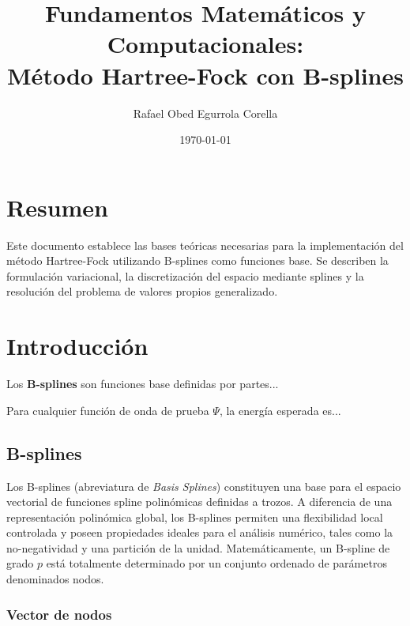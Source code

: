 \documentclass[12pt, a4paper, oneside, spanish]{book}
\title{\textbf{Fundamentos Matemáticos y Computacionales: \\ Método Hartree-Fock con B-splines}}
\author{Rafael Obed Egurrola Corella}
\date{\today}
\begin{document}
\frontmatter

\maketitle

\chapter*{Resumen}

Este documento establece las bases teóricas necesarias para la implementación del método Hartree-Fock utilizando B-splines como funciones base. Se describen la formulación variacional, la discretización del espacio mediante splines y la resolución del problema de valores propios generalizado.


\tableofcontents
\listoffigures

\mainmatter

\chapter{Introducción}

\begin{definition}
    Los \textbf{B-splines} son funciones base definidas por partes...
\end{definition}

\begin{theorem}
    Para cualquier función de onda de prueba $\Psi$, la energía esperada es...
\end{theorem}


\section{B-splines}

Los B-splines (abreviatura de \textit{Basis Splines}) constituyen una base para el espacio vectorial de funciones spline polinómicas definidas a trozos. A diferencia de una representación polinómica global, los B-splines permiten una flexibilidad local controlada y poseen propiedades ideales para el análisis numérico, tales como la no-negatividad y una partición de la unidad. Matemáticamente, un B-spline de grado \( p \) está totalmente determinado por un conjunto ordenado de parámetros denominados nodos.

\subsection{Vector de nodos}
\end{document}

